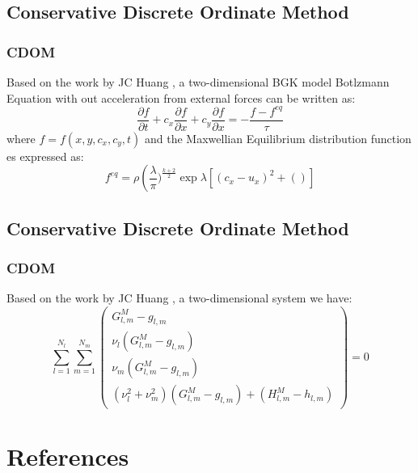 \documentclass[11pt,fleqn]{beamer}
\begin{document}
\subsection{Conservative Discrete Ordinate Method}
\begin{frame}
	\frametitle{CDOM}
	Based on the work by JC Huang \cite{JCHuang}, a two-dimensional BGK model Botlzmann Equation with out acceleration from external forces can be written as:
	\begin{equation}
		\frac{\partial f}{\partial t} + c_x \frac{\partial f}{\partial x} + c_y \frac{\partial f}{\partial x} = -\frac{f - f^{eq}}{\tau}
	\end{equation}
	where $f = f(x,y,c_x,c_y,t)$ and the Maxwellian Equilibrium distribution function es expressed as:
	\begin{equation}
		f^{eq} = \rho \left( \frac{\lambda}{\pi})^\frac{k+2}{2} \exp{\lambda[(c_x-u_x)^2+()]}
	\end{equation}
\end{frame}

\subsection{Conservative Discrete Ordinate Method}
\begin{frame}
	\frametitle{CDOM}
	Based on the work by JC Huang \cite{JCHuang}, a two-dimensional system we have:
	\begin{equation}
		\sum_{l=1}^{N_l}\sum_{m=1}^{N_m} 
			\begin{pmatrix}
			G_{l,m}^{M}-g_{l,m}\\ 
			\nu_l (G_{l,m}^{M}-g_{l,m})\\ 
			\nu_m (G_{l,m}^{M}-g_{l,m})\\ 
			(\nu_l^2+\nu_m^2) (G_{l,m}^{M}-g_{l,m})+(H_{l,m}^{M}-h_{l,m})
			\end{pmatrix} = 0 
	\end{equation}
\end{frame}

\section{References}
\end{document}
